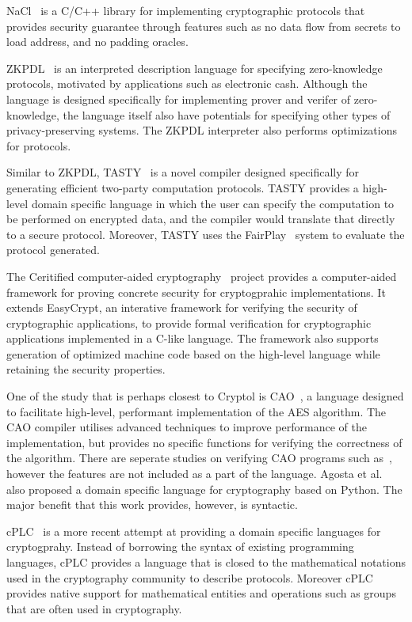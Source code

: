 \documentclass[a4paper, notitlepage]{report}
\begin{document}
NaCl~\cite{bernstein2012security} is a C/C++ library for implementing 
cryptographic protocols that 
provides security guarantee through features such as no data flow from 
secrets to load address, and no padding oracles. 

ZKPDL~\cite{meiklejohn2010zkpdl} is an interpreted description language 
for specifying zero-knowledge protocols, motivated by applications such
as electronic cash. Although the language is designed specifically for
implementing prover and verifer of zero-knowledge, the language itself 
also have potentials for specifying other types of privacy-preserving 
systems. The ZKPDL interpreter also performs optimizations for protocols.

Similar to ZKPDL, TASTY~\cite{henecka2010tasty} is a novel compiler
designed specifically for generating efficient two-party computation
protocols. TASTY provides a high-level domain specific language in which
the user can specify the computation to be performed on encrypted data, 
and the compiler would translate that directly to a secure protocol.
Moreover, TASTY uses the FairPlay~\cite{malkhi2004fairplay} system to
evaluate the protocol generated.

The Ceritified computer-aided cryptography~\cite{almeida2013certified} 
project provides a computer-aided framework for proving concrete security for
 cryptogprahic implementations. It extends EasyCrypt, an interative framework
for verifying the security of cryptographic applications, to
provide formal verification for cryptographic applications implemented 
in a C-like language. The framework also supports generation of 
optimized machine code based on the high-level language while
retaining the security properties.

One of the study that is perhaps closest to Cryptol is 
CAO~\cite{moss2010bridging}, a language designed to facilitate high-level,
performant implementation of the AES algorithm. The CAO compiler utilises
advanced techniques to improve performance of the implementation, but 
provides no specific functions for verifying the correctness of the algorithm.
There are seperate studies on verifying CAO programs such as~\cite{barbosa2010deductive},
however the features are not included as a part of the language.
Agosta et al.~\cite{agosta2007domain} also proposed a domain specific language
for cryptography based on Python. The major benefit that this work provides,
however, is syntactic.

cPLC~\cite{bangerter2011cplc} is a more recent attempt at providing a domain
specific languages for cryptogprahy. Instead of borrowing the syntax of existing
programming languages, cPLC provides a language that is closed to the 
mathematical notations used in the cryptography community to describe 
protocols. Moreover cPLC provides native support for mathematical entities
and operations such as groups that are often used in cryptography.
\end{document}
